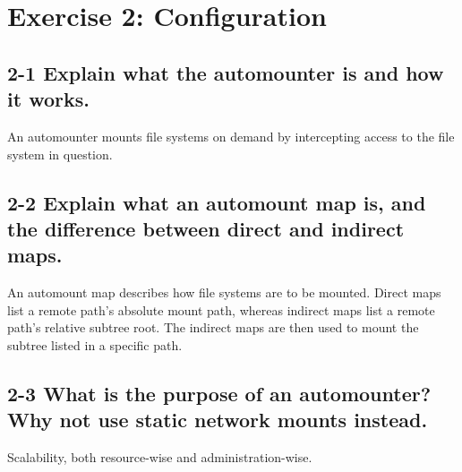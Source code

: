 
\section{Exercise 2: Configuration}
\subsection{2-1 Explain what the automounter is and how it works.}
An automounter mounts file systems on demand by intercepting access to the file system in question.

\subsection{2-2 Explain what an automount map is, and the difference between direct and indirect maps.}
An automount map describes how file systems are to be mounted. Direct maps list a remote path's absolute mount path, whereas indirect maps list a remote path's relative subtree root. The indirect maps are then used to mount the subtree listed in a specific path.

\subsection{2-3 What is the purpose of an automounter? Why not use static network mounts instead.}
Scalability, both resource-wise and administration-wise.


